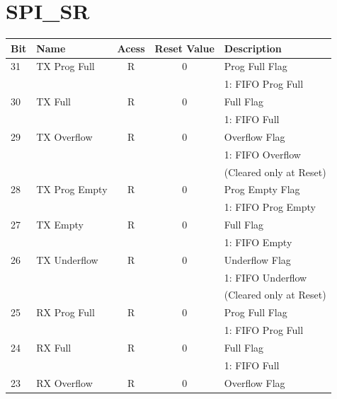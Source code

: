 \section{SPI\_SR}
\begin{table} [!h]
	\centering
		\begin{tabular} {|l|l|c|c|l|} \hline
		\textbf{Bit}		& \textbf{Name}	& \textbf{Acess} & \textbf{Reset Value}	& \textbf{Description} 				\\ \hline
	  31							& TX Prog Full	& R							 & 0										& Prog Full Flag 	  					\\
	  								&								&								 &											& 1: FIFO Prog Full 					\\ \hline
	  30							& TX Full				& R							 & 0										& Full Flag 	  							\\
	  								&								&								 &											& 1: FIFO Full 								\\ \hline
	  29							& TX Overflow		& R							 & 0										& Overflow Flag 							\\
	  								&								&								 &											& 1: FIFO Overflow						\\ 
	  								&								&								 &											& (Cleared only at Reset)			\\ \hline	  		
	  28							& TX Prog Empty & R							 & 0										& Prog Empty Flag 	  				\\
	  								&								&								 &											& 1: FIFO Prog Empty 		 			\\ \hline
	  27							& TX Empty			& R							 & 0										& Full Flag 	  							\\
	  								&								&								 &											& 1: FIFO Empty								\\ \hline
	  26							& TX Underflow	& R							 & 0										& Underflow Flag 							\\
	  								&								&								 &											& 1: FIFO Underflow						\\ 
	  								&								&								 &											& (Cleared only at Reset)			\\ \hline	 
	  25							& RX Prog Full	& R							 & 0										& Prog Full Flag 	  					\\
	  								&								&								 &											& 1: FIFO Prog Full 					\\ \hline
	  24							& RX Full				& R							 & 0										& Full Flag 	  							\\
	  								&								&								 &											& 1: FIFO Full 								\\ \hline
	  23							& RX Overflow		& R							 & 0										& Overflow Flag 							\\

\end{tabular}
\end{table}

